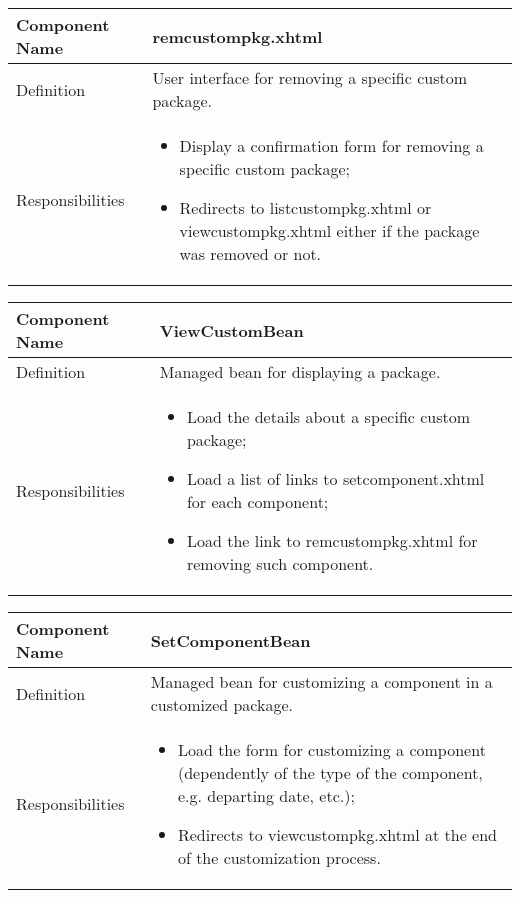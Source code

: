 \documentclass[a4paper,12pt]{book}
\begin{document}
      \begin{center}
        \begin{tabular}{ | p{3.3cm} | p{11.7cm} | }
          \hline
          Component Name & \textbf{remcustompkg.xhtml} \\ \hline
          Definition & User interface for removing a specific custom package. \\ \hline
          Responsibilities & \parbox{0.65\textwidth}{
            \begin{itemize}[noitemsep,leftmargin=*]
              \item Display a confirmation form for removing a specific custom package;
              \item Redirects to listcustompkg.xhtml or viewcustompkg.xhtml either if the package was removed or not.
            \end{itemize}} \\ \hline
          \end{tabular}
        \end{center}
        \begin{center}
          \begin{tabular}{ | p{3.3cm} | p{11.7cm} | }
            \hline
            Component Name & \textbf{ViewCustomBean} \\ \hline
            Definition & Managed bean for displaying a package. \\ \hline
            Responsibilities & \parbox{0.65\textwidth}{
              \begin{itemize}[noitemsep,leftmargin=*]
                \item Load the details about a specific custom package;
                \item Load a list of links to setcomponent.xhtml for each component;
                \item Load the link to remcustompkg.xhtml for removing such component.
              \end{itemize}} \\ \hline
            \end{tabular}
          \end{center}
          \begin{center}
            \begin{tabular}{ | p{3.3cm} | p{11.7cm} | }
              \hline
              Component Name & \textbf{SetComponentBean} \\ \hline
              Definition & Managed bean for customizing a component in a customized package. \\ \hline
              Responsibilities & \parbox{0.65\textwidth}{
                \begin{itemize}[noitemsep,leftmargin=*]
                  \item Load the form for customizing a component (dependently of the type of the component, e.g. departing date, etc.);
                  \item Redirects to viewcustompkg.xhtml at the end of the customization process.
                \end{itemize}} \\ \hline
              \end{tabular}
            \end{center}
\end{document}
